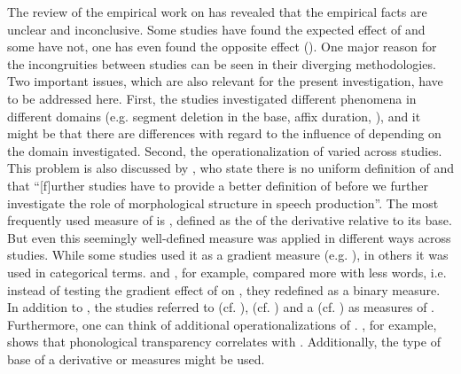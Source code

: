 {{%
The review of the empirical work on  has revealed that the empirical facts are unclear and inconclusive. Some studies have found the expected effect of  and some have not, one has even found the opposite effect (\citealt{Schuppler.2012}). 
One major reason for the incongruities between studies can be seen in their diverging methodologies. Two important issues, which are also relevant for the present investigation, have to be addressed  here. 
First, the studies investigated different phenomena in different domains (e.g. segment deletion in the base, affix duration, ), and it might be that there are differences with regard to the influence of  depending on the domain investigated. 
Second, the operationalization of  varied across studies. This problem is also discussed by \citet[16]{Hanique.2012}, who state there is no uniform definition of  and that ``[f]urther studies have to provide a better definition of  before we further investigate the role of morphological structure in speech production''. 
The most frequently used measure of  is , defined as the  of the derivative relative to its base. But even this seemingly well-defined measure was applied in different ways across studies. While some studies used it as a gradient measure (e.g. \citealt{Hanique.2011,Schuppler.2012}), in others it was used in categorical terms. \cite{Hay.2001} and \cite{Collie.2008}, for example, compared more  with less  words, i.e. instead of testing the gradient effect of  on , they redefined  as a binary measure. In addition to ,  the studies referred to  (cf. \citealt{Schuppler.2012}),  (cf. \citealt{Hay.2007}) and a  (cf. \citealt{Burki.2011}) as measures of . Furthermore, one can think of additional operationalizations of . \cite{Hay.2003}, for example, shows that phonological transparency correlates with . Additionally, the type of base of a derivative or  measures might be used.  

}}
